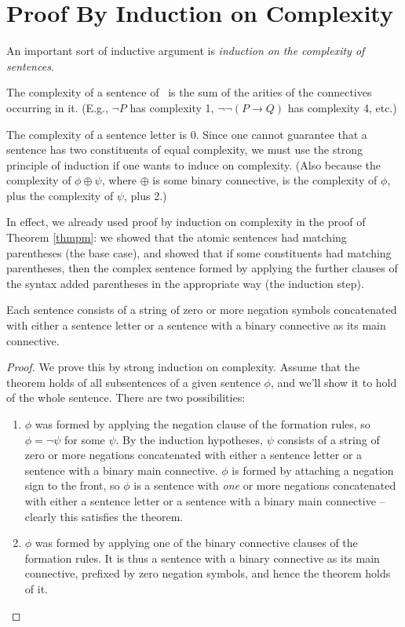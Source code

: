 \section{Proof By Induction on Complexity}

An important sort of inductive argument is \emph{induction on the complexity of sentences}.
\begin{definition}[Complexity] \label{defcompl}
	The complexity of a sentence of \lone\ is the sum of the arities of the connectives occurring in it. (E.g., $\neg P$ has complexity 1, $\neg\neg(P \to Q)$ has complexity 4, etc.)
\end{definition}
The complexity of a sentence letter is 0. Since one cannot guarantee that a sentence has two constituents of equal complexity, we must use the strong principle of induction if one wants to induce on complexity. (Also because the complexity of $\phi \oplus \psi$, where $\oplus$ is some binary connective, is the complexity of $\phi$, plus the complexity of $\psi$, plus 2.) 

In effect, we already used proof by induction on complexity in the proof of Theorem \ref{thmpm}: we showed that the atomic sentences had matching parentheses (the base case), and showed that if some constituents had matching parentheses, then the complex sentence formed by applying the further clauses of the syntax added parentheses in the appropriate way (the induction step). 

\begin{theorem}
Each sentence consists of a string of zero or more negation symbols concatenated with either a sentence letter or a sentence with a binary connective as its main connective.
\begin{proof}
	We prove this by strong induction on complexity. Assume that the theorem holds of all subsentences of a given sentence $\phi$, and we'll show it to hold of the whole sentence. There are two possibilities: \begin{enumerate}
		\item $\phi$ was formed by applying the negation clause of the formation rules, so $\phi = \neg\psi$ for some $\psi$. By the induction hypotheses, $\psi$ consists of a string of zero or more negations concatenated with either a sentence letter or a sentence with a binary main connective. $\phi$ is formed by attaching a negation sign to the front, so $\phi$ is a sentence with \emph{one} or more negations concatenated with either a sentence letter or a sentence with a binary main connective – clearly this satisfies the theorem.
		\item $\phi$ was formed by applying one of the binary connective clauses of the formation rules. It is thus a sentence with a binary connective as its main connective, prefixed by zero negation symbols, and hence the theorem holds of it.
	\end{enumerate}	
\end{proof}\end{theorem}




